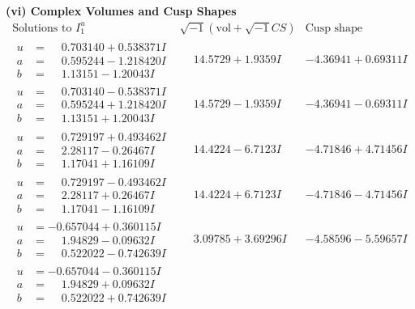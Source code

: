 \documentclass[1p]{elsarticle_modified}
\theoremstyle{definition}
\newcommand{\I}{\sqrt{-1}}
\begin{document}
\newpage\flushleft \textbf{(vi) Complex Volumes and Cusp Shapes}
$$\begin{array}{c|c|c}  
\text{Solutions to }I^u_{1}& \I (\text{vol} + \sqrt{-1}CS) & \text{Cusp shape}\\
 \hline 
\begin{aligned}
u &= \phantom{-}0.703140 + 0.538371 I \\
a &= \phantom{-}0.595244 - 1.218420 I \\
b &= \phantom{-}1.13151 - 1.20043 I\end{aligned}
 & \phantom{-}14.5729 + 1.9359 I & -4.36941 + 0.69311 I \\ \hline\begin{aligned}
u &= \phantom{-}0.703140 - 0.538371 I \\
a &= \phantom{-}0.595244 + 1.218420 I \\
b &= \phantom{-}1.13151 + 1.20043 I\end{aligned}
 & \phantom{-}14.5729 - 1.9359 I & -4.36941 - 0.69311 I \\ \hline\begin{aligned}
u &= \phantom{-}0.729197 + 0.493462 I \\
a &= \phantom{-}2.28117 - 0.26467 I \\
b &= \phantom{-}1.17041 + 1.16109 I\end{aligned}
 & \phantom{-}14.4224 - 6.7123 I & -4.71846 + 4.71456 I \\ \hline\begin{aligned}
u &= \phantom{-}0.729197 - 0.493462 I \\
a &= \phantom{-}2.28117 + 0.26467 I \\
b &= \phantom{-}1.17041 - 1.16109 I\end{aligned}
 & \phantom{-}14.4224 + 6.7123 I & -4.71846 - 4.71456 I \\ \hline\begin{aligned}
u &= -0.657044 + 0.360115 I \\
a &= \phantom{-}1.94829 - 0.09632 I \\
b &= \phantom{-}0.522022 - 0.742639 I\end{aligned}
 & \phantom{-}3.09785 + 3.69296 I & -4.58596 - 5.59657 I \\ \hline\begin{aligned}
u &= -0.657044 - 0.360115 I \\
a &= \phantom{-}1.94829 + 0.09632 I \\
b &= \phantom{-}0.522022 + 0.742639 I\end{aligned}

\end{array}$$
\end{document}

